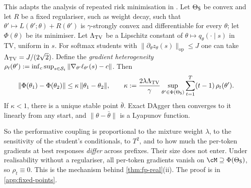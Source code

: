 \begin{proposition}\label{prop:contraction}
\Pv\Ck This adapts the analysis of repeated risk minimisation in \citet{perdomo2020performative}. Let $\Theta_{\mathsf{S}}$ be convex and let $R$ be a fixed regulariser, such
as weight decay, such that $\theta'\mapsto L(\theta';\theta)+R(\theta')$ is $\gamma$-strongly convex and differentiable for every $\theta$; let $\Phi(\theta)$ be its
minimiser. Let $\Lambda_{\mathrm{TV}}$ be a Lipschitz constant of $\theta\mapsto q_\theta(\cdot\mid s)$ in TV, uniform in $s$. For softmax students with
$\|\partial_\theta z_\theta(s)\|_{\mathrm{op}}\le J$ one can take $\Lambda_{\mathrm{TV}}=J/(2\sqrt2)$. Define the \emph{gradient heterogeneity}
$\rho_t(\theta'):=\inf_c\sup_{s\in\mathcal{S}_t}\|\nabla_{\theta'}\ell_{\theta'}(s)-c\|$. Then
\[
\|\Phi(\theta_1)-\Phi(\theta_2)\|\le\kappa\,\|\theta_1-\theta_2\|,\qquad
\kappa:=\frac{2\lambda\Lambda_{\mathrm{TV}}}{\gamma}\sup_{\theta'\in\Phi(\Theta_{\mathsf{S}})}\sum_{t=1}^T(t-1)\,\rho_t(\theta').
\]
If $\kappa<1$, there is a unique stable point $\bar\theta$. Exact DAgger then converges to it linearly from any start, and
$\|\theta-\bar\theta\|$ is a Lyapunov function.
\end{proposition}
\noindent
So the performative coupling is proportional to the mixture weight $\lambda$, to the sensitivity of the student's
conditionals, to $T^2$, and to how much the per-token gradients at best responses \emph{differ} across prefixes. Their
size does not enter. Under realisability without a regulariser, all per-token gradients vanish on $\cM\supseteq\Phi(\Theta_\TS)$, so
$\rho_t\equiv0$. This is the mechanism behind \cref{thm:fp-real}(ii). The proof is in \cref{app:fixed-points}.

